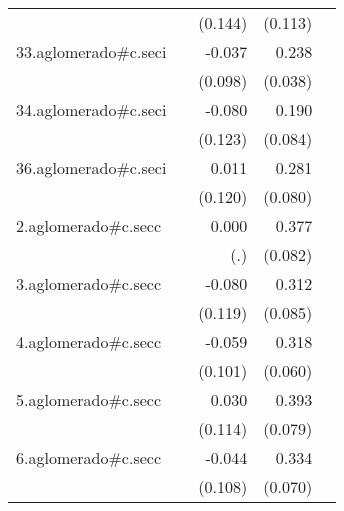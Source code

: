 {\begin{longtable}{l*{4}{D{.}{.}{-1}}}
            &                     &     (0.144)         &     (0.113)         &                     \\
\addlinespace
33.aglomerado#c.seci&                     &      -0.037         &       0.238\sym{***}&                     \\
            &                     &     (0.098)         &     (0.038)         &                     \\
\addlinespace
34.aglomerado#c.seci&                     &      -0.080         &       0.190\sym{*}  &                     \\
            &                     &     (0.123)         &     (0.084)         &                     \\
\addlinespace
36.aglomerado#c.seci&                     &       0.011         &       0.281\sym{***}&                     \\
            &                     &     (0.120)         &     (0.080)         &                     \\
\addlinespace
2.aglomerado#c.secc&                     &       0.000         &       0.377\sym{***}&                     \\
            &                     &         (.)         &     (0.082)         &                     \\
\addlinespace
3.aglomerado#c.secc&                     &      -0.080         &       0.312\sym{***}&                     \\
            &                     &     (0.119)         &     (0.085)         &                     \\
\addlinespace
4.aglomerado#c.secc&                     &      -0.059         &       0.318\sym{***}&                     \\
            &                     &     (0.101)         &     (0.060)         &                     \\
\addlinespace
5.aglomerado#c.secc&                     &       0.030         &       0.393\sym{***}&                     \\
            &                     &     (0.114)         &     (0.079)         &                     \\
\addlinespace
6.aglomerado#c.secc&                     &      -0.044         &       0.334\sym{***}&                     \\
            &                     &     (0.108)         &     (0.070)         &                     \\

\end{longtable}}
